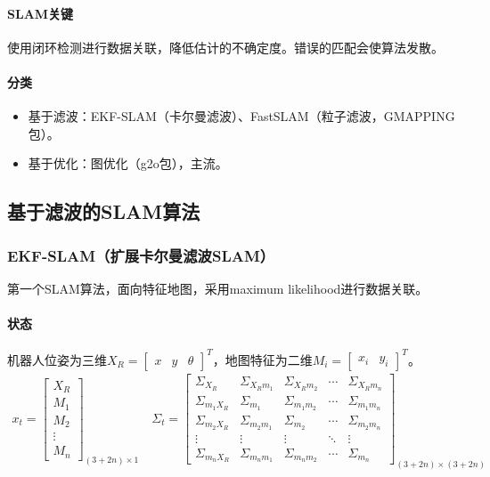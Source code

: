 \documentclass[
12pt, %
a4paper, 
oneside, %
headinclude,footinclude, %
]{scrartcl}
\begin{document}
\paragraph{SLAM关键}
使用闭环检测进行数据关联，降低估计的不确定度。错误的匹配会使算法发散。
\paragraph{分类}
\begin{itemize}
\item 基于滤波：EKF-SLAM（卡尔曼滤波）、FastSLAM（粒子滤波，GMAPPING包）。
\item 基于优化：图优化（g2o包），主流。
\end{itemize}
\subsection[基于滤波的SLAM算法]{基于滤波的SLAM算法}
\subsubsection[EKF-SLAM]{EKF-SLAM（扩展卡尔曼滤波SLAM）}
第一个SLAM算法，面向特征地图，采用maximum likelihood进行数据关联。
\paragraph{状态}
机器人位姿为三维$ X_R = \begin{bmatrix} x & y & \theta \end{bmatrix}^T $，地图特征为二维$ M_i = \begin{bmatrix} x_i & y_i \end{bmatrix}^T $。
\begin{align*}
x_t = \begin{bmatrix} X_R \\ M_1 \\ M_2 \\ \vdots \\ M_n \end{bmatrix}_{(3 + 2n) \times 1} \quad 
\Sigma_t = \begin{bmatrix} 
\Sigma_{X_R} & \Sigma_{X_R m_1} & \Sigma_{X_R m_2} & \cdots & \Sigma_{X_R m_n} \\
\Sigma_{m_1 X_R} & \Sigma_{m_1} & \Sigma_{m_1 m_2} & \cdots & \Sigma_{m_1 m_n} \\
\Sigma_{m_2 X_R} & \Sigma_{m_2 m_1} & \Sigma_{m_2} & \cdots & \Sigma_{m_2 m_n} \\
\vdots & \vdots & \vdots & \ddots & \vdots \\
\Sigma_{m_n X_R} & \Sigma_{m_n m_1} & \Sigma_{m_n m_2} & \cdots & \Sigma_{m_n}
\end{bmatrix}_{(3 + 2n) \times (3 + 2n)}
\end{align*}
\end{document}
